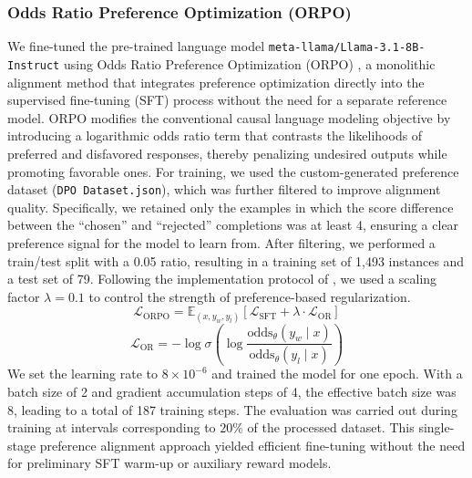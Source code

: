 \documentclass[11pt]{article}
\begin{document}
\subsubsection{Odds Ratio Preference Optimization (ORPO)}
We fine-tuned the pre-trained language model \texttt{meta-llama/Llama-3.1-8B-Instruct} using Odds Ratio Preference Optimization (ORPO) \citep{hong2024orpo}, a monolithic alignment method that integrates preference optimization directly into the supervised fine-tuning (SFT) process without the need for a separate reference model. ORPO modifies the conventional causal language modeling objective by introducing a logarithmic odds ratio term that contrasts the likelihoods of preferred and disfavored responses, thereby penalizing undesired outputs while promoting favorable ones. For training, we used the custom-generated preference dataset (\texttt{DPO Dataset.json}), which was further filtered to improve alignment quality. Specifically, we retained only the examples in which the score difference between the ``chosen'' and ``rejected'' completions was at least 4, ensuring a clear preference signal for the model to learn from. After filtering, we performed a train/test split with a 0.05 ratio, resulting in a training set of 1,493 instances and a test set of 79. Following the implementation protocol of \citet{hong2024orpo}, we used a scaling factor $\lambda = 0.1$ to control the strength of preference-based regularization. 
\begin{equation}
\mathcal{L}_{\text{ORPO}} = \mathbb{E}_{(x, y_w, y_l)} \left[ \mathcal{L}_{\text{SFT}} + \lambda \cdot \mathcal{L}_{\text{OR}} \right]
\end{equation}
\begin{equation}
\mathcal{L}_{\text{OR}} = -\log \sigma\left( \log \frac{\text{odds}_\theta(y_w \mid x)}{\text{odds}_\theta(y_l \mid x)} \right)
\end{equation}
We set the learning rate to $8 \times 10^{-6}$ and trained the model for one epoch. With a batch size of 2 and gradient accumulation steps of 4, the effective batch size was 8, leading to a total of 187 training steps. The evaluation was carried out during training at intervals corresponding to $20\%$ of the processed dataset. This single-stage preference alignment approach yielded efficient fine-tuning without the need for preliminary SFT warm-up or auxiliary reward models.
\end{document}
